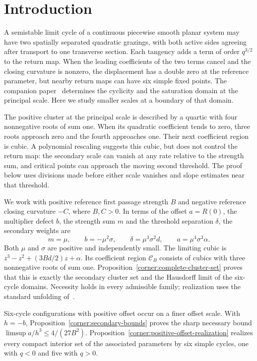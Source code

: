 \section{Introduction}\label{sup:introduction}

A semistable limit cycle of a continuous piecewise smooth planar system may
have two spatially separated quadratic grazings, with both active sides
agreeing after transport to one transverse section. Each tangency adds a term
of order $q^{3/2}$ to the return map. When the leading coefficients of the two
terms cancel and the closing curvature is nonzero, the displacement has a
double zero at the reference parameter, but nearby return maps can have six
simple fixed points. The companion paper~\cite{main2026} determines the
cyclicity and the saturation domain at the principal scale. Here we study
smaller scales at a boundary of that domain.

The positive cluster at the principal scale is described by a quartic with
four nonnegative roots of sum one. When its quadratic coefficient tends to
zero, three roots approach zero and the fourth approaches one. Their next
coefficient region is cubic. A polynomial rescaling suggests this cubic, but
does not control the return map: the secondary scale can vanish at any rate
relative to the strength sum, and critical points can approach the moving
second threshold. The proof below uses divisions made before either scale
vanishes and slope estimates near that threshold.

We work with positive reference first passage strength $B$ and negative
reference closing curvature $-C$, where $B,C>0$. In terms of the offset
$a=R(0)$, the multiplier defect $b$, the strength sum $m$ and the threshold
separation $\delta$, the secondary weights are
\[
 m=\mu,\qquad b=-\mu^2\sigma,\qquad
 \delta=\mu^3\sigma^2d,\qquad a=\mu^4\sigma^3\alpha.
\]
Both $\mu$ and $\sigma$ are positive and independently small. The limiting
cubic is $z^3-z^2+(3Bd/2)z+\alpha$. Its coefficient region
$\mathcal C_B$ consists of cubics with three nonnegative roots of sum one.
Proposition~\ref{corner:complete-cluster-set} proves that this is exactly
the secondary cluster set and the Hausdorff limit of the six-cycle domains.
Necessity holds in every admissible family; realization uses the standard
unfolding of~\cite{main2026}.

Six-cycle configurations with positive offset occur on a finer offset scale.
With $h=-b$, Proposition~\ref{corner:secondary-bounds} proves the sharp
necessary bound $\limsup a/h^3\leq4/(27B^2)$.
Proposition~\ref{corner:positive-offset-realization} realizes every compact
interior set of the associated parameters by six simple cycles, one with
$q<0$ and five with $q>0$.

